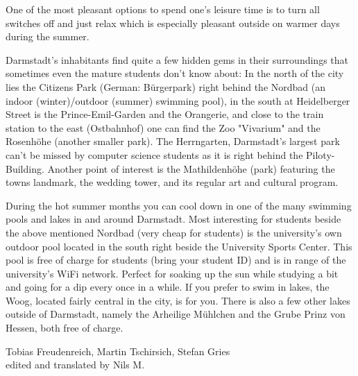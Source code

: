 {One of the most pleasant options to spend one's leisure time is to turn all switches off and just relax which is especially pleasant outside on warmer days during the summer.
}{
    Darmstadt's inhabitants find quite a few hidden gems in their surroundings that sometimes even the mature students don't know about: In the north of the city lies the Citizens Park (German: Bürgerpark) right behind the Nordbad (an indoor (winter)/outdoor (summer) swimming pool), in the south at Heidelberger Street is the Prince-Emil-Garden and the Orangerie, and close to the train station to the east (Ostbahnhof) one can find the Zoo "Vivarium" and the Rosenhöhe (another smaller park).
    The Herrngarten, Darmstadt's largest park can't be missed by computer science students as it is right behind the Piloty-Building. Another point of interest is the Mathildenhöhe (park) featuring the towns landmark, the wedding tower, and its regular art and cultural program.

    During the hot summer months you can cool down in one of the many swimming pools and lakes in and around Darmstadt. Most interesting for students beside the above mentioned Nordbad (very cheap for students) is the university's own outdoor pool located in the south right beside the University Sports Center. This pool is free of charge for students (bring your student ID) and is in range of the university's WiFi network. Perfect for soaking up the sun while studying a bit and going for a dip every once in a while.
    If you prefer to swim in lakes, the Woog, located fairly central in the city, is for you. There is also a few other lakes outside of Darmstadt, namely the Arheilige Mühlchen and the Grube Prinz von Hessen, both free of charge.
}
{Tobias Freudenreich, Martin Tschirsich, Stefan Gries \\ edited and translated by Nils M.}
\newpage
